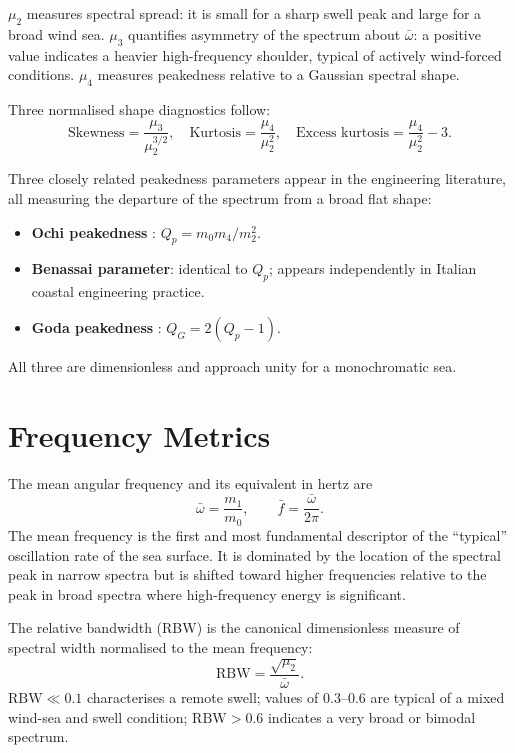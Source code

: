 \documentclass[journal]{IEEEtran}
\begin{document}
    $\mu_2$ measures spectral spread: it is small for a sharp swell peak
    and large for a broad wind sea.
    $\mu_3$ quantifies asymmetry of the spectrum about $\bar\omega$:
    a positive value indicates a heavier high-frequency shoulder, typical
    of actively wind-forced conditions.
    $\mu_4$ measures peakedness relative to a Gaussian spectral shape.

    Three normalised shape diagnostics follow:
    \begin{equation}
        \text{Skewness} = \frac{\mu_3}{\mu_2^{3/2}},
        \quad
        \text{Kurtosis} = \frac{\mu_4}{\mu_2^2},
        \quad
        \text{Excess kurtosis} = \frac{\mu_4}{\mu_2^2} - 3.
    \end{equation}

    \noindent
    Three closely related peakedness parameters appear in the engineering
    literature, all measuring the departure of the spectrum from a broad
    flat shape:
    \begin{itemize}
        \item \textbf{Ochi peakedness} \cite{Ochi1998}: $Q_p = m_0 m_4/m_2^2$.
        \item \textbf{Benassai parameter}: identical to $Q_p$; appears
        independently in Italian coastal engineering practice.
        \item \textbf{Goda peakedness} \cite{Goda1970}: $Q_G = 2(Q_p - 1)$.
    \end{itemize}
    All three are dimensionless and approach unity for a monochromatic sea.

    \section{Frequency Metrics}
    \label{sec:freq}

    The mean angular frequency and its equivalent in hertz are
    \begin{equation}
        \bar\omega = \frac{m_1}{m_0}, \qquad \bar{f} = \frac{\bar\omega}{2\pi}.
    \end{equation}
    The mean frequency is the first and most fundamental descriptor of the
    ``typical'' oscillation rate of the sea surface.
    It is dominated by the location of the spectral peak in narrow spectra
    but is shifted toward higher frequencies relative to the peak in broad
    spectra where high-frequency energy is significant.

    The relative bandwidth (RBW) is the canonical dimensionless measure of
    spectral width normalised to the mean frequency:
    \begin{equation}
        \mathrm{RBW} = \frac{\sqrt{\mu_2}}{\bar\omega}.
        \label{eq:rbw}
    \end{equation}
    $\mathrm{RBW} \ll 0.1$ characterises a remote swell; values of
    $0.3$--$0.6$ are typical of a mixed wind-sea and swell condition;
    $\mathrm{RBW} > 0.6$ indicates a very broad or bimodal spectrum.
\end{document}
